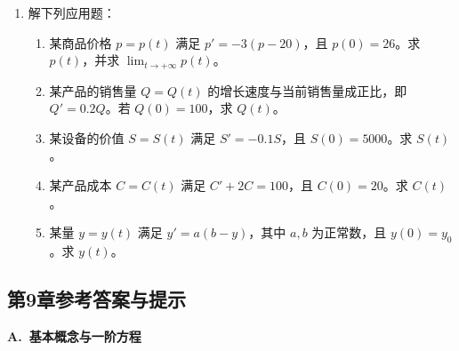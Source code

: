 \documentclass[fontset=fandol]{ctexart}
\begin{document}
\begin{enumerate}
\item 解下列应用题：
\begin{enumerate}
\item[(1)] 某商品价格 $p=p(t)$ 满足 $\displaystyle p'=-3(p-20)$，且 $p(0)=26$。求 $p(t)$，并求 $\displaystyle \lim_{t\to+\infty}p(t)$。
\item[(2)] 某产品的销售量 $Q=Q(t)$ 的增长速度与当前销售量成正比，即 $Q'=0.2Q$。若 $Q(0)=100$，求 $Q(t)$。
\item[(3)] 某设备的价值 $S=S(t)$ 满足 $S'=-0.1S$，且 $S(0)=5000$。求 $S(t)$。
\item[(4)] 某产品成本 $C=C(t)$ 满足 $C'+2C=100$，且 $C(0)=20$。求 $C(t)$。
\item[(5)] 某量 $y=y(t)$ 满足 $y'=a(b-y)$，其中 $a,b$ 为正常数，且 $y(0)=y_0$。求 $y(t)$。
\end{enumerate}
\end{enumerate}

\subsection*{第9章参考答案与提示}

\textbf{A.\ 基本概念与一阶方程}
\end{document}
